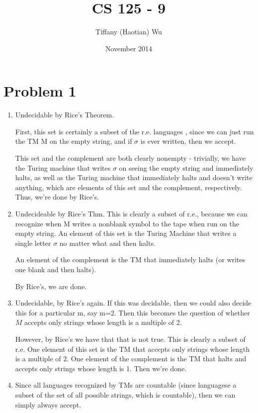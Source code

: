 \documentclass{article}
\title{CS 125 - 9}
\author{Tiffany (Haotian) Wu}
\date{November 2014}
\begin{document}
\maketitle

\section*{Problem 1}
\begin{enumerate}[label=(\alph*)]
\item Undecidable by Rice's Theorem. 

First, this set is certainly a subset of the r.e. languages , since we can just run the TM M on the empty string, and if $\sigma$ is ever written, then we accept.

This set and the complement are both clearly nonempty - trivially, we have the Turing machine that writes $\sigma$ on seeing the empty string and immediately halts, as well as the Turing machine that immediately halts and doesn't write anything, which are elements of this set and the complement, respectively. Thus, we're done by Rice's.



\item
Undecideable by Rice's Thm. This is clearly a subset of r.e., because we can recognize when M writes a nonblank symbol to the tape when run on the empty string. 
An element of this set is the Turing Machine that writes a single letter $\sigma$ no matter what and then halts.

An element of the complement is the TM that immediately halts (or writes one blank and then halts).

By Rice's, we are done.

\item
Undecidable, by Rice's again. If this was decidable, then we could also decide this for a particular m, say m=2. Then this becomes the question of whether $M$ accepts only strings whose length is a multiple of 2. 

However, by Rice's we have that that is not true. This is clearly a subset of r.e. One element of this set is the TM that accepts only strings whose length is a multiple of 2.  One element of the complement is the TM that halts and accepts only strings whose length is 1. Then we're done.


\item
Since all languages recognized by TMs are countable (since languagese a subset of the set of all possible strings, which is countable), then we can simply always accept.


\end{enumerate}
\end{document}
